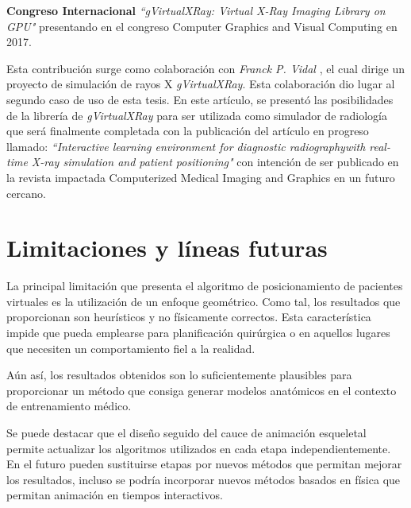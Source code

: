 \textbf{ Congreso Internacional }\emph{``gVirtualXRay: Virtual X-Ray Imaging Library on GPU"}\cite{sujar:hal} presentando en el congreso Computer Graphics and Visual Computing en 2017.

Esta contribución surge como colaboración con \emph{Franck P. Vidal} \cite{gVirtualXRay}, el cual dirige un proyecto de simulación de rayos X \emph{gVirtualXRay}. Esta colaboración dio lugar al segundo caso de uso de esta tesis. En este artículo, se presentó las posibilidades de la librería de \emph{gVirtualXRay} para ser utilizada como simulador de radiología que será finalmente completada con la publicación del artículo en progreso llamado: \emph{``Interactive learning environment for diagnostic radiographywith real-time X-ray simulation and patient positioning"} con intención de ser publicado en la revista impactada Computerized Medical Imaging and Graphics en un futuro cercano. 




\section{Limitaciones y líneas futuras}
\label{conclu:future}

La principal limitación que presenta el algoritmo de posicionamiento de pacientes virtuales es la utilización de un enfoque geométrico. Como tal, los resultados que proporcionan son heurísticos y no físicamente correctos. Esta característica impide que pueda emplearse para planificación quirúrgica o en aquellos lugares que necesiten un comportamiento fiel a la realidad. 

Aún así, los resultados obtenidos son lo suficientemente plausibles para proporcionar un método que consiga generar modelos anatómicos en el contexto de entrenamiento médico.

Se puede destacar que el diseño seguido del cauce de animación esqueletal permite actualizar los algoritmos utilizados en cada etapa independientemente. En el futuro pueden sustituirse etapas por nuevos métodos que permitan mejorar los resultados, incluso se podría incorporar nuevos métodos basados en física que permitan animación en tiempos interactivos.


